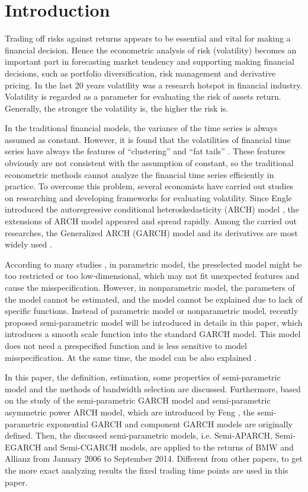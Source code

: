 \chapter{Introduction}\label{secIntroduction}
Trading off risks against returns appears to be essential and vital for making a financial decision. Hence the econometric analysis of risk (volatility) becomes an important part in forecasting market tendency and supporting making financial decisions, such as portfolio diversification, risk management and derivative pricing. In the last 20 years volatility was a research hotspot in financial industry. Volatility is regarded as a parameter for evaluating the risk of assets return. Generally, the stronger the volatility is, the higher the risk is.

In the traditional financial models, the variance of the time series is always assumed as constant. However, it is found that the volatilities of financial time series have always the features of ``clustering'' and ``fat tails'' \citep{Mandelbrot1963,EugeneF.Fama1965}. These features obviously are not consistent with the assumption of constant, so the traditional econometric methods cannot analyze the financial time series efficiently in practice. To overcome this problem, several economists have carried out studies on researching and developing frameworks for evaluating volatility. Since Engle introduced the autoregressive conditional heteroskedasticity (ARCH) model \citep{Engle1982}, the extensions of ARCH model appeared and spread rapidly. Among the carried out researches, the Generalized ARCH (GARCH) model and its derivatives are most widely used \citep{Bollerslev1986}.

 According to many studies \citep{Gourieroux1992,Eubank1993}, in parametric model, the preselected model might be too restricted or too low-dimensional, which may not fit unexpected features and cause the misspecification. However, in nonparametric model, the parameters of the model cannot be estimated, and the model cannot be explained due to lack of specific functions. Instead of parametric model or nonparametric model, recently proposed semi-parametric model will be introduced in details in this paper, which introduces a smooth scale function into the standard GARCH model. This model does not need a prespecified function and is less sensitive to model misspecification. At the same time, the model can be also explained \citep{Di2011}.

In this paper, the definition, estimation, some properties of semi-parametric model and the methods of bandwidth selection are discussed. Furthermore, based on the study of the semi-parametric GARCH model and semi-parametric asymmetric power ARCH model, which are introduced by Feng \citep{Feng2004,FengYuanhua;Sun2013}, the semi-parametric exponential GARCH and component GARCH models are originally defined. Then, the discussed semi-parametric models, i.e. Semi-APARCH, Semi-EGARCH and Semi-CGARCH models, are applied to the returns of BMW and Allianz from January 2006 to September 2014. Different from other papers, to get the more exact analyzing results the fixed trading time points are used in this paper.

